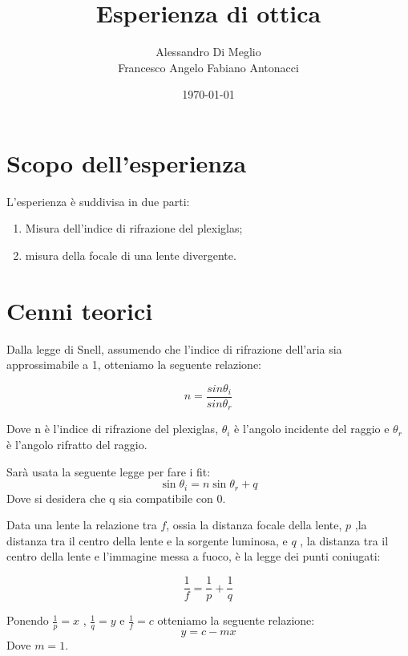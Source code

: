 \documentclass{article}
\title{Esperienza di ottica}
\author{Alessandro Di Meglio \\ Francesco Angelo Fabiano Antonacci}
\date{\today}
\begin{document}
\maketitle
\section{Scopo dell'esperienza}
L'esperienza è suddivisa in due parti:

\begin{enumerate}
\item Misura dell'indice di rifrazione del plexiglas;
\item misura della focale di una lente divergente.

\end{enumerate}

\section{Cenni teorici}

Dalla legge di Snell, assumendo che l'indice di rifrazione dell'aria sia approssimabile a 1, otteniamo la seguente relazione:

	\begin{equation}
		n=\frac{sin\theta_i}{sin\theta_r}
			\label{eq:snell}
	\end{equation}

Dove n è l'indice di rifrazione del plexiglas, $\theta_i$ è l'angolo incidente del raggio e  $\theta_r$ è l'angolo  rifratto del raggio.


Sarà usata la seguente legge per fare i fit:
		\begin{equation}
				\sin{\theta_i}=n\sin{\theta_r}+q
							\label{eq:lin}
		\end{equation}
Dove si desidera che q sia compatibile con 0.


Data una lente la relazione tra $f$, ossia la distanza focale della lente, $p$ ,la distanza tra il centro della lente e la sorgente luminosa, e $q$ , la distanza tra il centro della lente e l'immagine messa a fuoco, è la legge dei punti coniugati:

\begin{equation}
\frac{1}{f}=\frac{1}{p}+\frac{1}{q}
\label{eq:pcon}
\end{equation}

Ponendo $\frac{1}{p}=x$ ,  $\frac{1}{q}=y$ e $\frac{1}{f}=c$ otteniamo la seguente relazione:
\begin{equation}
y=c-mx
\label{eq::)}
\end{equation}
Dove $m=1$.
\end{document}
